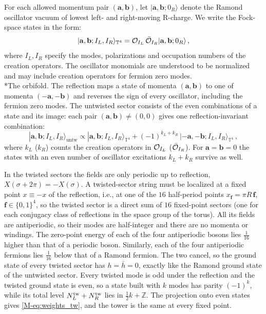 \documentclass[aps,onecolumn,groupedaddress,nofootinbib,pra]{revtex4-2}
\makeatletter
\renewcommand\paragraph{\@startsection{paragraph}{4}{\parindent}{\z@}{-1em}{\normalfont\normalsize\bfseries}}
\newcommand{\Tf}{\mathbb T^4}
\newcommand{\bff}{\mathbf f}
\newcommand{\ba}{\mathbf a}
\newcommand{\bb}{\mathbf b}
\makeatother
\begin{document}
For each allowed momentum pair $(\ba,\bb)$, let $|\ba,\bb;0_R\rangle$ denote the Ramond oscillator vacuum of lowest left- and right-moving R-charge. We write the Fock-space states in the form:
\begin{equation}
|\ba,\bb;I_L,I_R\rangle_{\Tf} = {\cal O}_{I_L}\,\bar{\cal O}_{I_R}
|\ba,\bb;0_R\rangle\,,
\end{equation}
where $I_L,I_R$ specify the modes, polarizations and occupation numbers of the creation operators. The oscillator monomials are understood to be normalized and may include creation operators for fermion zero modes.\\

\paragraph*{The orbifold.}
The reflection maps a state of momenta $(\ba,\bb)$ to one of momenta $(-\ba,-\bb)$ and reverses the sign of every oscillator, including the fermion zero modes. The untwisted sector consists of the even combinations of a state and its image: each pair $(\ba,\bb)\neq(0,0)$ gives one reflection-invariant combination:
\begin{equation}
|\ba,\bb;I_L,I_R\rangle_{\text{untw}} \propto |\ba,\bb;I_L,I_R\rangle_{\Tf} + (-1)^{k_L+k_R} \, |-\ba,-\bb;I_L,I_R\rangle_{\Tf}\,,
\end{equation}
where $k_L$ ($k_R$) counts the creation operators in ${\cal O}_{I_L}$ ($\bar {\cal O}_{I_R}$). For $\ba=\bb=0$ the states with an even number of oscillator excitations $k_L+k_R$ survive as well. 

In the twisted sectors the fields are only periodic up to reflection, $X(\sigma+2\pi)=-X(\sigma)$. A twisted-sector string must be localized at a fixed point $x\equiv-x$ of the reflection, i.e., at one of the $16$ half-period points $x_\bff=\pi R\,\bff$, $\bff\in\{0,1\}^4$, so the twisted sector is a direct sum of $16$ fixed-point sectors (one for each conjugacy class of reflections in the space group of the torus). All its fields are antiperiodic, so their modes are half-integer and there are no momenta or windings. The zero-point energy of each of the four antiperiodic bosons lies $\frac1{16}$ higher than that of a periodic boson. Similarly, each of the four antiperiodic fermions lies $\frac1{16}$ below that of a Ramond fermion. The two cancel, so the ground state of every twisted sector has $h=\bar h=0$, exactly like the Ramond ground state of the untwisted sector. Every twisted mode is odd under the reflection and the twisted ground state is even, so a state built with $k$ modes has parity $(-1)^k$, while its total level $N^{\rm tw}_L+N^{\rm tw}_R$ lies in $\frac{1}{2}k+\mathbb Z$. The projection onto even states gives \eqref{M-eq:weights_tw}, and the tower is the same at every fixed point.\\
\end{document}
